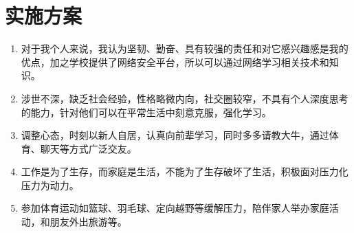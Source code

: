 \documentclass{article}
\begin{document}
\section{实施方案}
	\begin{enumerate}[1、]
		\item 对于我个人来说，我认为坚韧、勤奋、具有较强的责任和对它感兴趣感是我的优点，加之学校提供了网络安全平台，所以可以通过网络学习相关技术和知识。
		\item 涉世不深，缺乏社会经验，性格略微内向，社交圈较窄，不具有个人深度思考的能力，针对他们可以在平常生活中刻意克服，强化学习。
		\item 调整心态，时刻以新人自居，认真向前辈学习，同时多多请教大牛，通过体育、聊天等方式广泛交友。
		\item 工作是为了生存，而家庭是生活，不能为了生存破坏了生活，积极面对压力化压力为动力。
		\item 参加体育运动如篮球、羽毛球、定向越野等缓解压力，陪伴家人举办家庭活动，和朋友外出旅游等。
	\end{enumerate}
\par 

\end{document}
